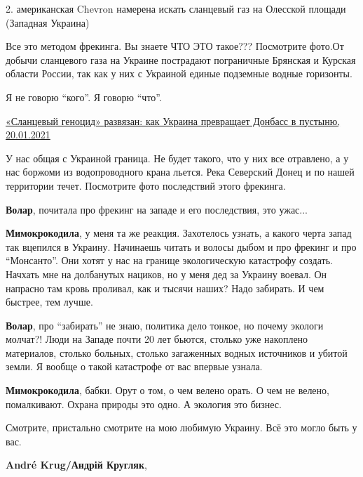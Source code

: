 \begin{itemize}
\begin{itemize}
2. американская Chevron намерена искать сланцевый газ на Олесской площади (Западная Украина)

Все это методом фрекинга. Вы знаете ЧТО ЭТО такое??? Посмотрите фото.От добычи
сланцевого газа на Украине пострадают пограничные Брянская и Курская области
России, так как у них с Украиной единые подземные водные горизонты.

Я не говорю \enquote{кого}. Я говорю \enquote{что}.

\href{https://sevastopol-su.turbopages.org/sevastopol.su/s/news/slancevyy-genocid-razvyazan-kak-ukraina-prevrashchaet-donbass-v-pustynyu}{«Сланцевый геноцид» развязан: как Украина превращает Донбасс в пустыню, 20.01.2021%
}

У нас общая с Украиной граница. Не будет такого, что у них все отравлено, а у
нас боржоми из водопроводного крана льется. Река Северский Донец и по нашей
территории течет. Посмотрите фото последствий этого фрекинга.

\textbf{Волар}, почитала про фрекинг на западе и его последствия, это ужас...

\textbf{Мимокрокодила}, у меня та же реакция. Захотелось узнать, а какого черта запад
так вцепился в Украину. Начинаешь читать и волосы дыбом и про фрекинг и про
\enquote{Монсанто}. Они хотят у нас на границе экологическую катастрофу создать.
Начхать мне на долбанутых нациков, но у меня дед за Украину воевал. Он напрасно
там кровь проливал, как и тысячи наших? Надо забирать. И чем быстрее, тем
лучше.

\textbf{Волар}, про \enquote{забирать} не знаю, политика дело тонкое, но почему экологи молчат?!
Люди на Западе почти 20 лет бьются, столько уже накоплено материалов, столько
больных, столько загаженных водных источников и убитой земли. Я вообще о такой
катастрофе от вас впервые узнала.

\textbf{Мимокрокодила}, бабки. Орут о том, о чем велено орать. О чем не велено,
помалкивают. Охрана природы это одно. А экология это бизнес.

\end{itemize} %


Смотрите, пристально смотрите на мою любимую Украину. Всё это могло быть у вас.

\begin{itemize} %
\textbf{André Krug/Андрій Кругляк}, 


\end{itemize}
\end{itemize}

